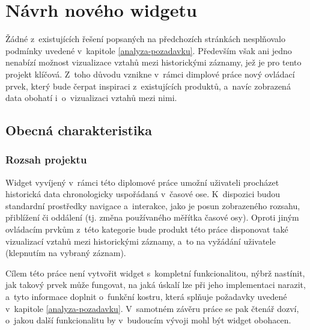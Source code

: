 \graphicspath{{text/navrh/img/}}

\chapter{Návrh nového widgetu}
\label{navrh}
	Žádné z~existujících řešení popsaných na předchozích stránkách nesplňo\-valo pod\-mínky uvedené v~kapitole \ref{analyza-pozadavku}. Především však ani jedno nenabízí možnost vizualizace vztahů mezi historickými záznamy, jež je pro tento projekt klíčová. Z~toho důvodu vznikne v~rámci dimplové práce nový ovládací prvek, který bude čerpat inspiraci z~existujících produktů, a~navíc zobrazená data obohatí i~o~vizualizaci vztahů mezi nimi.

	\section{Obecná charakteristika}
		\label{obecna-charakteristika}
		
		\subsection{Rozsah projektu}
		\label{rozsah-projektu}
			Widget vyvíjený v~rámci této diplomové práce umožní uživateli procházet historická data chronologicky uspořádaná v~časové ose. K~dispozici budou standardní prostředky navigace a~interakce, jako je posun zobrazeného rozsahu, přiblížení či oddálení (tj. změna používaného měřítka časové osy). Oproti jiným ovládacím prvkům z~této kategorie bude produkt této práce disponovat také vizualizací vztahů mezi historickými záznamy, a~to na vyžádání uživatele (klepnutím na vybraný záznam).
			
			Cílem této práce není vytvořit widget s~kompletní funkcionalitou, nýbrž nastí\-nit, jak takový prvek může fungovat, na jaká úskalí lze při jeho implementaci narazit, a~tyto informace doplnit o~funkční kostru, která splňuje požadavky uvedené v~kapitole \ref{analyza-pozadavku}.  V~samotném závěru práce se pak čtenář dozví, o~jakou další funkcionalitu by v~budoucím vývoji mohl být widget obohacen.
			
